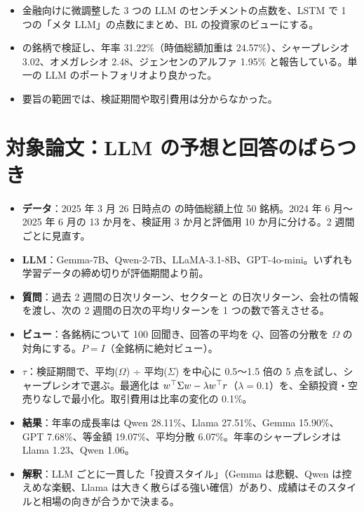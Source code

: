 \begin{paperbox}
\begin{itemize}
\item 金融向けに微調整した 3 つの LLM のセンチメントの点数を、LSTM で 1 つの「メタ LLM」の点数にまとめ、BL の投資家のビューにする。
\item \SP{} の銘柄で検証し、年率 31.22\%（時価総額加重は 24.57\%）、シャープレシオ 3.02、オメガレシオ 2.48、ジェンセンのアルファ 1.95\% と報告している。単一の LLM のポートフォリオより良かった。
\item 要旨の範囲では、検証期間や取引費用は分からなかった。
\end{itemize}
\end{paperbox}

\section{対象論文：LLM の予想と回答のばらつき}

\begin{paperbox}
\begin{itemize}
\item \textbf{データ}：2025 年 3 月 26 日時点の \SP{} の時価総額上位 50 銘柄。2024 年 6 月〜2025 年 6 月の 13 か月を、検証用 3 か月と評価用 10 か月に分ける。2 週間ごとに見直す。
\item \textbf{LLM}：Gemma-7B、Qwen-2-7B、LLaMA-3.1-8B、GPT-4o-mini。いずれも学習データの締め切りが評価期間より前。
\item \textbf{質問}：過去 2 週間の日次リターン、セクターと \SP{} の日次リターン、会社の情報を渡し、次の 2 週間の日次の平均リターンを 1 つの数で答えさせる。
\item \textbf{ビュー}：各銘柄について 100 回聞き、回答の平均を $Q$、回答の分散を $\Omega$ の対角にする。$P=I$（全銘柄に絶対ビュー）。
\item \textbf{$\tau$}：検証期間で、平均($\Omega$) ÷ 平均($\Sigma$) を中心に 0.5〜1.5 倍の 5 点を試し、シャープレシオで選ぶ。最適化は $w^{\top}\Sigma w-\lambda w^{\top} r$（$\lambda=0.1$）を、全額投資・空売りなしで最小化。取引費用は比率の変化の 0.1\%。
\item \textbf{結果}：年率の成長率は Qwen 28.11\%、Llama 27.51\%、Gemma 15.90\%、GPT 7.68\%、等金額 19.07\%、平均分散 6.07\%。年率のシャープレシオは Llama 1.23、Qwen 1.06。
\item \textbf{解釈}：LLM ごとに一貫した「投資スタイル」（Gemma は悲観、Qwen は控えめな楽観、Llama は大きく散らばる強い確信）があり、成績はそのスタイルと相場の向きが合うかで決まる。
\end{itemize}
\end{paperbox}

